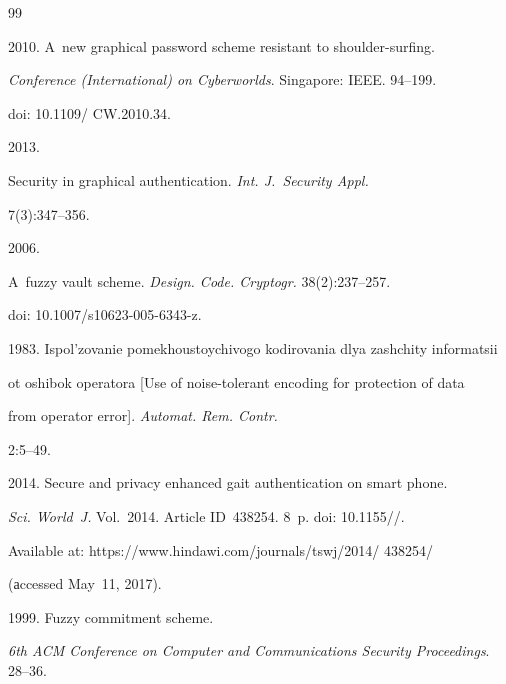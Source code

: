 {{\begin{thebibliography}{99}


 2010. A~new graphical password scheme resistant to shoulder-surfing.


\textit{Conference (International) on Cyberworlds}. Singapore: IEEE.  94--199. 


doi: 10.1109\!/ CW.2010.34.







 2013. 


Security in graphical authentication. \textit{Int. J.~Security  Appl.}


7(3):347--356.







 2006. 


A~fuzzy vault scheme. \textit{Design. Code. Cryptogr.} 38(2):237--257. 


doi: 10.1007\!/\!s10623-005-6343-z.






1983. Ispol'zovanie pomekhoustoychivogo kodirovania dlya zashchity informatsii 


ot oshibok operatora [Use of noise-tolerant encoding for protection of data 


from operator error]. \textit{Automat. Rem. Contr.} 


2:5--49.






2014. Secure and privacy enhanced gait authentication on smart phone. 


\textit{Sci. World~J.} Vol.~2014. Article ID~438254. 8~p. doi: 10.1155\!/\!/.


 Available at: {\sf https://www.hindawi.com/journals/tswj/2014/ 438254/}


   (аccessed May~11, 2017). 




  1999. Fuzzy commitment scheme. 


\textit{6th ACM Conference on Computer and Communications Security Proceedings}. 28--36. 



\end{thebibliography}}}
